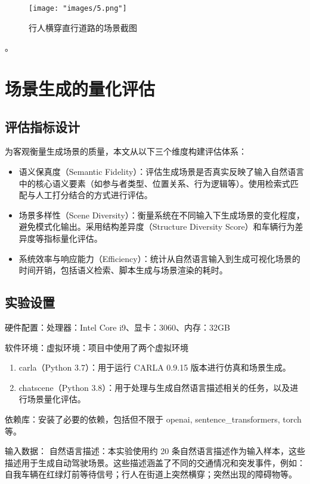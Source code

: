 \documentclass{article}
\begin{document}
\begin{figure}[H]
	\centering
	\texttt{[image: "images/5.png"]}
	\caption{行人横穿直行道路的场景截图}
	\label{fig:pedestrian_crossing}
\end{figure}


。




\section{场景生成的量化评估}

\subsection{评估指标设计}
为客观衡量生成场景的质量，本文从以下三个维度构建评估体系：
\begin{itemize}
	\item 语义保真度（Semantic Fidelity）：评估生成场景是否真实反映了输入自然语言中的核心语义要素（如参与者类型、位置关系、行为逻辑等）。使用检索式匹配与人工打分结合的方式进行评估。
	\item 场景多样性（Scene Diversity）：衡量系统在不同输入下生成场景的变化程度，避免模式化输出。采用结构差异度（Structure Diversity Score）和车辆行为差异度等指标量化评估。
	\item 系统效率与响应能力（Efficiency）：统计从自然语言输入到生成可视化场景的时间开销，包括语义检索、脚本生成与场景渲染的耗时。
\end{itemize}

\subsection{实验设置}
硬件配置：处理器：Intel Core i9、显卡：3060、内存：32GB

软件环境：虚拟环境：项目中使用了两个虚拟环境
\begin{enumerate}
	\item carla（Python 3.7）：用于运行 CARLA 0.9.15 版本进行仿真和场景生成。
	\item chatscene（Python 3.8）：用于处理与生成自然语言描述相关的任务，以及进行场景量化评估。
\end{enumerate}

依赖库：安装了必要的依赖，包括但不限于 openai, sentence\_transformers, torch 等。

输入数据：
自然语言描述：本实验使用约 20 条自然语言描述作为输入样本，这些描述用于生成自动驾驶场景。这些描述涵盖了不同的交通情况和突发事件，例如：自我车辆在红绿灯前等待信号；行人在街道上突然横穿；突然出现的障碍物等。
\end{document}

